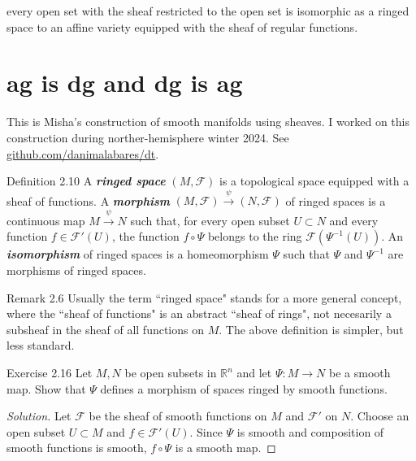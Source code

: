 \begin{tcolorbox}[colback=white,colframe=black,boxrule=0.5pt,sharp corners]
every open set with the sheaf restricted to the open set is isomorphic as a ringed space to an affine variety equipped with the sheaf of regular functions.
\end{tcolorbox}

\section{ag is dg and dg is ag}

This is Misha's construction of smooth manifolds using sheaves. I worked on this construction during norther-hemisphere winter 2024. See \href{https://github.com/danimalabares/dt}{github.com/danimalabares/dt}.

\begin{thing3}{Definition 2.10}\leavevmode
	A \textit{\textbf{ringed space}} $(M,\mathcal{F})$ is a topological space equipped with a sheaf of functions. A \textit{\textbf{morphism}} $(M,\mathcal{F}) \xrightarrow{\psi}(N,\mathcal{F})$ of ringed spaces is a continuous map $M \xrightarrow{\psi}N$ such that, for every open subset $U \subset N$ and every function $f \in \mathcal{F}'(U)$, the function $f \circ \Psi$ belongs to the ring $\mathcal{F}(\Psi^{-1}(U))$. An \textit{\textbf{isomorphism}} of ringed spaces is a homeomorphism $\Psi$ such that $\Psi$ and $\Psi^{-1}$ are morphisms of ringed spaces.
\end{thing3}

\begin{thing5}{Remark 2.6}\leavevmode
	Usually the term ``ringed space" stands for a more general concept, where the ``sheaf of functions" is an abstract ``sheaf of rings", not necesarily a subsheaf in the sheaf of all functions on  $M$. The above definition is simpler, but less standard.
\end{thing5}

\begin{thing4}{Exercise 2.16}\label{exer:2.16}\leavevmode
Let $M, N$ be open subsets in $\mathbb{R}^n$ and let  $\Psi:M \to N$ be a smooth map. Show that $\Psi$ defines a morphism of spaces ringed by smooth functions.
\end{thing4}

\begin{proof}[Solution]\leavevmode
Let $\mathcal{F}$ be the sheaf of smooth functions on $M$ and  $\mathcal{F}'$ on $N$. Choose an open subset $U\subset M$ and $f \in \mathcal{F}'(U)$. Since $\Psi$ is smooth and composition of smooth functions is smooth, $f \circ \Psi$ is a smooth map.
\end{proof}

